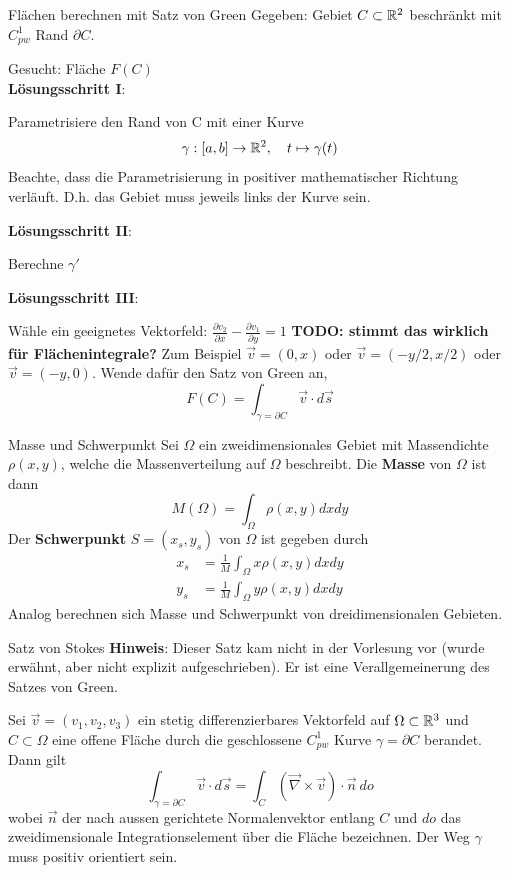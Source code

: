 \begin{Rezept}{Flächen berechnen mit Satz von Green}{}
	Gegeben: Gebiet $C \subset \mathbb{R}^2$ beschränkt mit $C^1_{pw}$ Rand $\partial C$.
	
	Gesucht: Fläche $F(C)$\\
	
	\textbf{Lösungsschritt I}:
	
	Parametrisiere den Rand von C mit einer Kurve
	\[
  		\gamma:[a, b] \to \mathbb{R}^2,\quad t \mapsto \gamma(t)
	\]
	Beachte, dass die Parametrisierung in positiver mathematischer Richtung verläuft. D.h. das Gebiet muss jeweils links der Kurve sein.
	
	\textbf{Lösungsschritt II}:
	
	Berechne $\gamma'$

	\textbf{Lösungsschritt III}:
	
	Wähle ein geeignetes Vektorfeld:
	$\frac{\partial v_2}{\partial x} -\frac{\partial v_1}{\partial y} = 1$ 
	\textbf{TODO: stimmt das wirklich für Flächenintegrale?}
	Zum Beispiel $\vec v = (0, x)$ oder $\vec v = (-y/2, x/2)$ oder $\vec v = (-y, 0)$.
	Wende dafür den Satz von Green an,
	\[
  		F(C) = \int_{\gamma=\partial C} \vec{v} \cdot d\vec{s}
	\]
\end{Rezept}

\begin{Satz}{Masse und Schwerpunkt}{}
	Sei $\Omega$ ein zweidimensionales Gebiet mit Massendichte $\rho(x, y)$, welche die Massenverteilung auf $\Omega$ beschreibt. Die \textbf{Masse} von $\Omega$ ist dann	
	\[
		M(\Omega) = \int_\Omega \rho(x, y) dx dy
	\]
	Der \textbf{Schwerpunkt} $S=(x_s, y_s)$ von $\Omega$ ist gegeben durch
	\begin{align*}
		x_s &= \frac{1}{M} \int_\Omega x \rho (x, y) dx dy\\
		y_s &= \frac{1}{M} \int_\Omega y \rho (x, y) dx dy
	\end{align*} 
	Analog berechnen sich Masse und Schwerpunkt von dreidimensionalen Gebieten.
\end{Satz}

\begin{Satz}{Satz von Stokes}{}
	\textbf{Hinweis}: Dieser Satz kam nicht in der Vorlesung vor (wurde erwähnt, aber nicht explizit aufgeschrieben). Er ist eine Verallgemeinerung des Satzes von Green.
	
	Sei $\vec{v} = (v_1, v_2, v_3)$ ein stetig differenzierbares Vektorfeld auf $\Omega \subset \mathbb{R}^3$ und $C \subset \Omega$ eine offene Fläche durch die geschlossene $C^1_{pw}$ Kurve $\gamma = \partial C$ berandet. Dann gilt
	\[
		\int_{\gamma=\partial C} \vec{v} \cdot d\vec{s} = 
		\int_C (\vec \nabla \times \vec v) \cdot \vec n\ do
	\]
	wobei $\vec n$ der nach aussen gerichtete Normalenvektor entlang $C$ und $do$ das zweidimensionale Integrationselement über die Fläche bezeichnen. Der Weg $\gamma$ muss positiv orientiert sein.	
	
\end{Satz}

